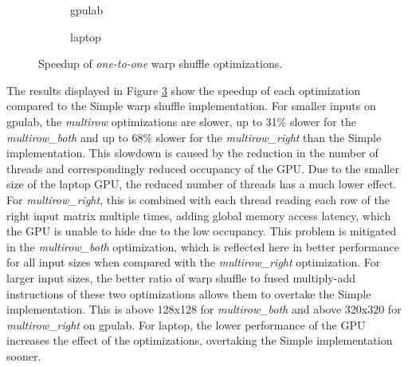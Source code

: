 \begin{figure}[ht]
	\centering	
	\begin{subfigure}{0.4\textwidth}
		\centering
		\def\svgwidth{\textwidth}
		
		\caption{gpulab}
		\label{fig:warp_shuffle_one_to_one_results_gpulab}
	\end{subfigure}
	\begin{subfigure}{0.4\textwidth}
		\centering
		\def\svgwidth{\textwidth}
		
		\caption{laptop}
		\label{fig:warp_shuffle_one_to_one_results_laptop}
	\end{subfigure}

	
	\caption{Speedup of \textit{one-to-one} warp shuffle optimizations.}
	\label{fig:warp_shuffle_one_to_one_results}
\end{figure}

The results displayed in Figure \ref{fig:warp_shuffle_one_to_one_results} show the speedup of each optimization compared to the Simple warp shuffle implementation. For smaller inputs on gpulab, the \textit{multirow} optimizations are slower, up to 31\% slower for the \textit{multirow\_both} and up to 68\% slower for the \textit{multirow\_right} than the Simple implementation. This slowdown is caused by the reduction in the number of threads and correspondingly reduced occupancy of the GPU. Due to the smaller size of the laptop GPU, the reduced number of threads has a much lower effect. For \textit{multirow\_right}, this is combined with each thread reading each row of the right input matrix multiple times, adding global memory access latency, which the GPU is unable to hide due to the low occupancy. This problem is mitigated in the \textit{multirow\_both} optimization, which is reflected here in better performance for all input sizes when compared with the \textit{multirow\_right} optimization. For larger input sizes, the better ratio of warp shuffle to fused multiply-add instructions of these two optimizations allows them to overtake the Simple implementation. This is above 128x128 for \textit{multirow\_both} and above 320x320 for \textit{multirow\_right} on gpulab. For laptop, the lower performance of the GPU increases the effect of the optimizations, overtaking the Simple implementation sooner. 

